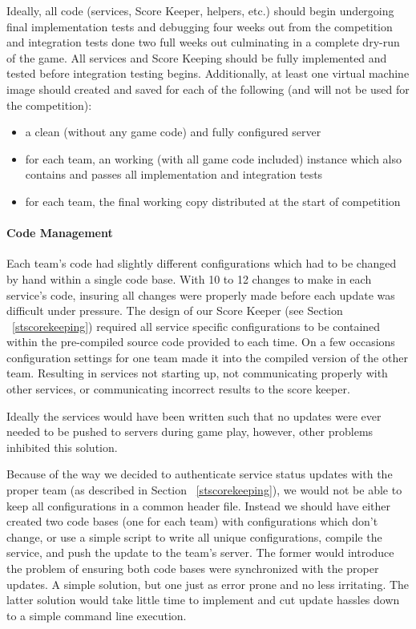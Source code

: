 \documentclass[10pt]{article}
\begin{document}
Ideally, all code (services, Score Keeper, helpers, etc.) should begin
undergoing final implementation tests and debugging four weeks out from the
competition and integration tests done two full weeks out culminating in a
complete dry-run of the game. All services and Score Keeping should be fully
implemented and tested before integration testing begins. Additionally, at least
one virtual machine image should created and saved for each of the following
(and will not be used for the competition):

\begin{itemize}
  \item a clean (without any game code) and fully configured server
  \item for each team, an working (with all game code included) instance which
  also contains and passes all implementation and integration tests
  \item for each team, the final working copy distributed at the start of
  competition
\end{itemize}

\paragraph*{Code Management} Each team's code had slightly different
configurations which had to be changed by hand within a single code base. With
10 to 12 changes to make in each service's code, insuring all changes were
properly made before each update was difficult under pressure. The design of
our Score Keeper (see Section ~\ref{stscorekeeping}) required all service
specific configurations to be contained within the pre-compiled source code
provided to each time. On a few occasions configuration settings for one team
made it into the compiled version of the other team. Resulting in services not
starting up, not communicating properly with other services, or communicating
incorrect results to the score keeper.

Ideally the services would have been written such that no updates were ever
needed to be pushed to servers during game play, however, other problems
inhibited this solution. 

Because of the way we decided to authenticate service status updates with
the proper team (as described in Section ~\ref{stscorekeeping}), we would
not be able to keep all configurations in a common header file. Instead we
should have either created two code bases (one for each team) with
configurations which don't change, or use a simple script to write all unique
configurations, compile the service, and push the update to the team's server.
The former would introduce the problem of ensuring both code bases were
synchronized with the proper updates. A simple solution, but one just as error
prone and no less irritating. The latter solution would take little time to
implement and cut update hassles down to a simple command line execution.
\end{document}
